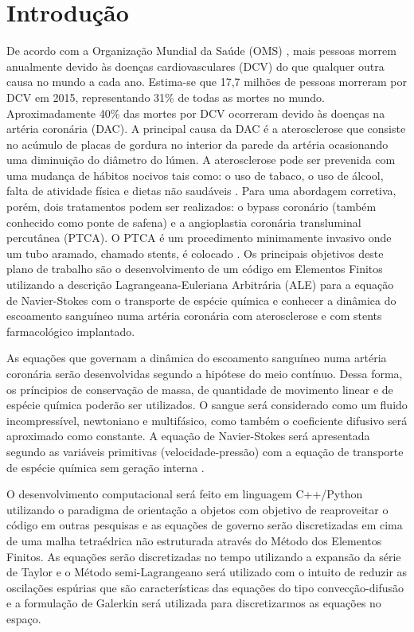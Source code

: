 \section{Introdução}

De acordo com a Organização Mundial da Saúde (OMS) \cite{oms}, mais pessoas morrem anualmente devido às doenças cardiovasculares (DCV) do que qualquer outra causa no mundo a cada ano. 
Estima-se que 17,7 milhões de pessoas morreram por DCV em 2015, representando 31\% de todas as mortes no mundo. 
Aproximadamente 40\% das mortes por DCV ocorreram devido às doenças na artéria coronária (DAC). 
A principal causa da DAC é a aterosclerose que consiste no acúmulo de placas de gordura no interior da parede da artéria ocasionando uma diminuição do diâmetro do lúmen. 
A aterosclerose pode ser prevenida com uma mudança de hábitos nocivos tais como: o uso de tabaco, o uso de álcool, falta de atividade física e dietas não saudáveis \cite{spring2013}. 
Para uma abordagem corretiva, porém, dois tratamentos podem ser realizados: o bypass coronário (também conhecido como ponte de safena) e a angioplastia coronária transluminal percutânea (PTCA). 
O PTCA é um procedimento minimamente invasivo onde um tubo aramado, chamado stents, é colocado \cite{sigwart1987}.
Os principais objetivos deste plano de trabalho são o desenvolvimento de um código em Elementos Finitos utilizando a descrição Lagrangeana-Euleriana Arbitrária (ALE) \cite{donea2004} para a equação de Navier-Stokes com o transporte de espécie química e 
conhecer a dinâmica do escoamento sanguíneo numa artéria coronária com aterosclerose e com stents farmacológico implantado.

\bigskip
As equações que governam a dinâmica do escoamento sanguíneo numa artéria coronária serão desenvolvidas segundo a hipótese do meio contínuo. 
Dessa forma, os príncipios de conservação de massa, de quantidade de movimento linear e de espécie química poderão ser utilizados. 
O sangue será considerado como um fluido incompressível, newtoniano e multifásico, como também o coeficiente difusivo será aproximado como constante. 
A equação de Navier-Stokes será apresentada segundo as variáveis primitivas (velocidade-pressão) com a equação de transporte de espécie química sem geração interna \cite{batchelor1967}.
 
\bigskip
O desenvolvimento computacional será feito em linguagem C++/Python \cite{c++} \cite{python} utilizando o paradigma de orientação a objetos com objetivo de reaproveitar o código em outras pesquisas e 
as equações de governo serão discretizadas em cima de uma malha tetraédrica não estruturada através do Método dos Elementos Finitos. 
As equações serão discretizadas no tempo utilizando a expansão da série de Taylor e 
o Método semi-Lagrangeano \cite{pironneau1982} será utilizado com o intuito de reduzir as oscilações espúrias que são características das equações do tipo convecção-difusão e 
a formulação de Galerkin \cite{zienkiewicz1965} será utilizada para discretizarmos as equações no espaço. 

